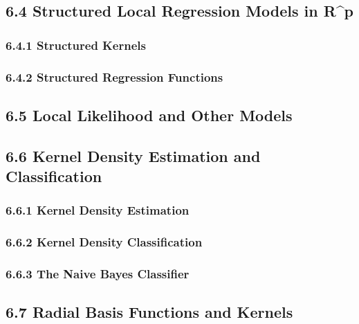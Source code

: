 \documentclass[11pt]{article}
\begin{document}
\subsection{6.4 Structured Local Regression Models in
R\^{}p}\label{structured-local-regression-models-in-rp}

\subsubsection{6.4.1 Structured Kernels}\label{structured-kernels}

\subsubsection{6.4.2 Structured Regression
Functions}\label{structured-regression-functions}

\subsection{6.5 Local Likelihood and Other
Models}\label{local-likelihood-and-other-models}

\subsection{6.6 Kernel Density Estimation and
Classification}\label{kernel-density-estimation-and-classification}

\subsubsection{6.6.1 Kernel Density
Estimation}\label{kernel-density-estimation}

\subsubsection{6.6.2 Kernel Density
Classification}\label{kernel-density-classification}

\subsubsection{6.6.3 The Naive Bayes
Classifier}\label{the-naive-bayes-classifier}

\subsection{6.7 Radial Basis Functions and
Kernels}\label{radial-basis-functions-and-kernels}
\end{document}
